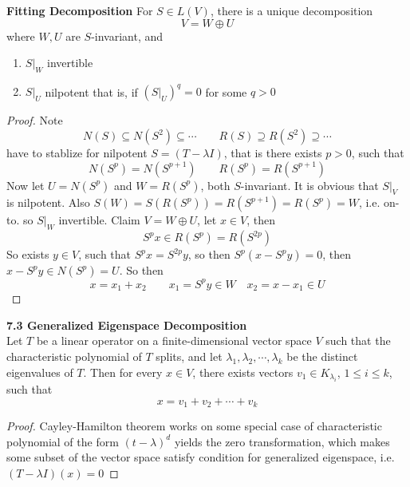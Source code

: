 \documentclass[11pt]{article}
\begin{document}
\begin{lemma*}
    \textbf{Fitting Decomposition} For $S\in L(V)$, there is a unique decomposition 
    \[
        V = W \oplus U    
    \]
    where $W,U$ are $S$-invariant, and 
    \begin{enumerate}
        \item $S|_W$ invertible 
        \item $S|_U$ nilpotent that is, if $(S|_U)^q = 0$ for some $q > 0$
    \end{enumerate}
    \begin{proof}
        Note 
        \[
            N(S) \subseteq N(S^2) \subseteq \cdots 
            \qquad 
            R(S) \supseteq R(S^2) \supseteq \cdots
        \]
        have to stablize for nilpotent $S = (T-\lambda I)$, that is there exists $p>0$, such that 
        \[
            N(S^p) = N(S^{p+1})
            \qquad 
            R(S^p) = R(S^{p+1})
        \]
        Now let $U = N(S^p)$ and $W = R(S^p)$, both $S$-invariant. It is obvious that $S|_V$ is nilpotent. Also $S(W) = S(R(S^p)) = R(S^{p+1}) = R(S^p) = W$, i.e. on-to. so $S|_W$ invertible. Claim $V = W\oplus U$, let $x\in V$, then 
        \[
            S^px \in R(S^p) = R(S^{2p})
        \]
        So exists $y\in V$, such that $S^px = S^{2p}y$, so then $S^p(x - S^py) = 0$, then $x - S^p y \in N(S^p) = U$. So then
        \[
            x = x_1 + x_2 
            \qquad 
            x_1 = S^p y \in W
            \quad
            x_2 = x - x_1 \in U
        \]

    \end{proof}
\end{lemma*}
 

\begin{theorem*}
    \textbf{7.3 Generalized Eigenspace Decomposition} \\
    Let $T$ be a linear operator on a finite-dimensional vector space $V$ such that the characteristic polynomial of $T$ splits, and let $\lambda_1,\lambda_2,\cdots, \lambda_k$ be the distinct eigenvalues of $T$. Then for every $x\in V$, there exists vectors $v_1\in K_{\lambda_i}$, $1\leq i \leq k$, such that 
    \[ 
        x = v_1 + v_2 + \cdots + v_k    
    \]
    \begin{proof}
        Cayley-Hamilton theorem works on some special case of characteristic polynomial of the form $(t-\lambda)^d$ yields the zero transformation, which makes some subset of the vector space satisfy condition for generalized eigenspace, i.e. $(T-\lambda I)(x) = 0$
    \end{proof}
\end{theorem*}
\end{document}
